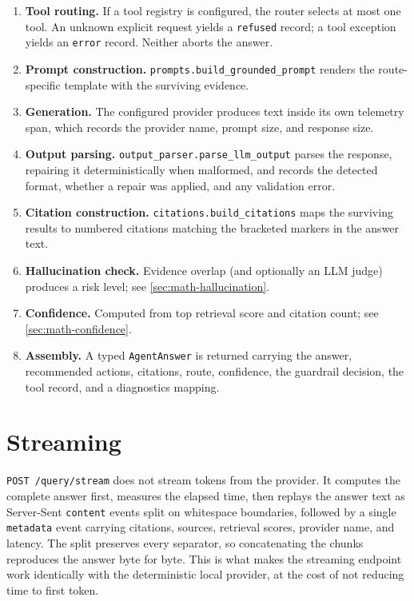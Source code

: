 \begin{enumerate}
    the drop count is recorded; the request continues with the survivors.
  \item \textbf{Tool routing.} If a tool registry is configured, the router
    selects at most one tool. An unknown explicit request yields a
    \texttt{refused} record; a tool exception yields an \texttt{error} record.
    Neither aborts the answer.
  \item \textbf{Prompt construction.} \texttt{prompts.build\_grounded\_prompt}
    renders the route-specific template with the surviving evidence.
  \item \textbf{Generation.} The configured provider produces text inside its
    own telemetry span, which records the provider name, prompt size, and
    response size.
  \item \textbf{Output parsing.} \texttt{output\_parser.parse\_llm\_output}
    parses the response, repairing it deterministically when malformed, and
    records the detected format, whether a repair was applied, and any
    validation error.
  \item \textbf{Citation construction.} \texttt{citations.build\_citations}
    maps the surviving results to numbered citations matching the bracketed
    markers in the answer text.
  \item \textbf{Hallucination check.} Evidence overlap (and optionally an LLM
    judge) produces a risk level; see \cref{sec:math-hallucination}.
  \item \textbf{Confidence.} Computed from top retrieval score and citation
    count; see \cref{sec:math-confidence}.
  \item \textbf{Assembly.} A typed \texttt{AgentAnswer} is returned carrying
    the answer, recommended actions, citations, route, confidence, the
    guardrail decision, the tool record, and a diagnostics mapping.
\end{enumerate}

\section{Streaming}

\texttt{POST /query/stream} does not stream tokens from the provider. It
computes the complete answer first, measures the elapsed time, then replays the
answer text as Server-Sent \texttt{content} events split on whitespace
boundaries, followed by a single \texttt{metadata} event carrying citations,
sources, retrieval scores, provider name, and latency. The split preserves
every separator, so concatenating the chunks reproduces the answer byte for
byte. This is what makes the streaming endpoint work identically with the
deterministic local provider, at the cost of not reducing time to first token.

